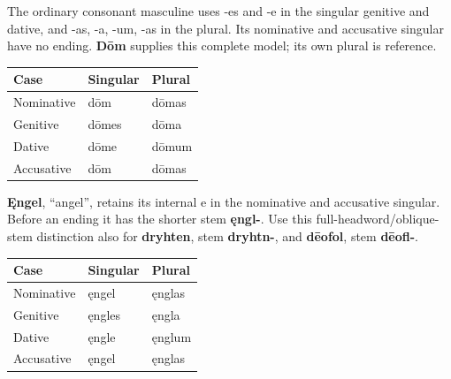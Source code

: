 The ordinary consonant masculine uses -es and -e in the singular genitive and dative, and -as, -a, -um, -as in the plural. Its nominative and accusative singular have no ending. \textbf{Dōm} supplies this complete model; its own plural is reference.

\par\begingroup
\fontsize{10.5}{13.2}\selectfont
\setlength{\LTleft}{0pt}\setlength{\LTright}{\fill}
\noindent
\begin{tabular}{@{}>{\raggedright\arraybackslash}p{39.46mm}>{\raggedright\arraybackslash}p{39.46mm}>{\raggedright\arraybackslash}p{39.46mm}@{}}
\toprule
\textbf{Case} & \textbf{Singular} & \textbf{Plural} \\
\midrule
Nominative & dōm & dōmas \\
Genitive & dōmes & dōma \\
Dative & dōme & dōmum \\
Accusative & dōm & dōmas \\
\bottomrule
\end{tabular}
\par\endgroup

\textbf{Ęngel}, “angel”, retains its internal e in the nominative and accusative singular. Before an ending it has the shorter stem \textbf{ęngl-}. Use this full-headword/\allowbreak{}oblique-stem distinction also for \textbf{dryhten}, stem \textbf{dryhtn-}, and \textbf{dēofol}, stem \textbf{dēofl-}.

\par\begingroup
\fontsize{10.5}{13.2}\selectfont
\setlength{\LTleft}{0pt}\setlength{\LTright}{\fill}
\noindent
\begin{tabular}{@{}>{\raggedright\arraybackslash}p{39.46mm}>{\raggedright\arraybackslash}p{39.46mm}>{\raggedright\arraybackslash}p{39.46mm}@{}}
\toprule
\textbf{Case} & \textbf{Singular} & \textbf{Plural} \\
\midrule
Nominative & ęngel & ęnglas \\
Genitive & ęngles & ęngla \\
Dative & ęngle & ęnglum \\
Accusative & ęngel & ęnglas \\
\bottomrule
\end{tabular}
\par\endgroup

